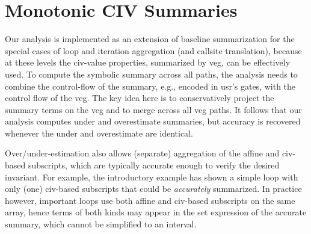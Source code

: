 \documentclass{sig-alternate}
\begin{document}
\section{Monotonic CIV Summaries}
\label{sec:MonotonicCiv}


Our analysis is implemented as an extension of baseline 
summarization for the special cases of loop and iteration 
aggregation (and callsite translation), because at these 
levels the {\sc civ}-value properties, summarized by 
{\sc veg}, can be effectively used.
%
To compute the symbolic summary across all paths, the analysis
needs to combine the control-flow of the summary, e.g., 
encoded in {\sc usr}'s gates, with the control flow of the {\sc veg}. 
The key idea here is to conservatively project the summary terms 
on the {\sc veg} and to merge across all {\sc veg} paths.
It follows that our analysis computes under and overestimate
summaries, but accuracy is recovered whenever the under and 
overestimate are identical.
%

Over/under-estimation also allows (separate) aggregation of the 
affine and {\sc civ}-based subscripts, which are typically
accurate enough to verify the desired invariant.
%
For example, the introductory example has shown a simple loop 
with only (one) {\sc civ}-based subscripts that could be
{\em accurately} summarized.
%
In practice however, important loops use both %
affine and {\sc civ}-based subscripts on the same array, hence 
terms of both kinds may appear in the set expression %
of the accurate summary, which cannot be simplified
to an interval.


%
\end{document}
